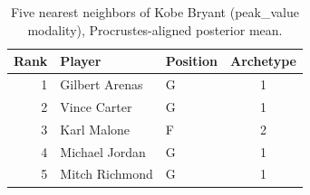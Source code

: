 \begin{table}[htbp]
  \centering\small
  \begin{tabular}{rllc}
    \toprule
    Rank & Player & Position & Archetype \\
    \midrule
    1 & Gilbert Arenas & G & 1 \\
    2 & Vince Carter & G & 1 \\
    3 & Karl Malone & F & 2 \\
    4 & Michael Jordan & G & 1 \\
    5 & Mitch Richmond & G & 1 \\
    \bottomrule
  \end{tabular}
  \caption{Five nearest neighbors of Kobe Bryant (peak_value modality), Procrustes-aligned posterior mean.}
  \label{tab:Kobe_Bryant_neighbors_peak_value}
\end{table}

